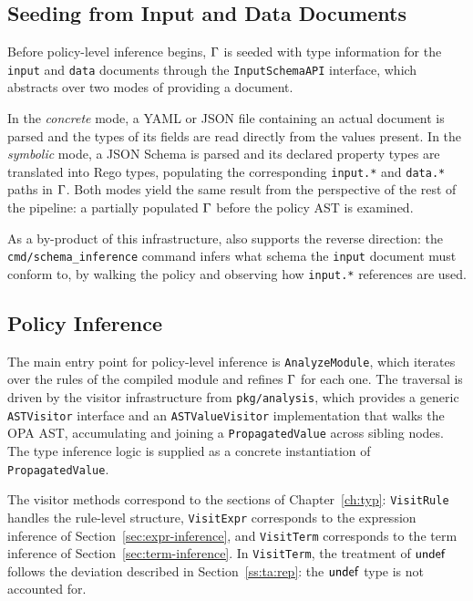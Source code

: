 \subsection{Seeding from Input and Data Documents}
\label{ss:ta:seed}

Before policy-level inference begins, $\Gamma$ is seeded with type information for the \texttt{input} and \texttt{data} documents through the \texttt{InputSchemaAPI} interface, which abstracts over two modes of providing a document.

In the \emph{concrete} mode, a YAML or JSON file containing an actual document is parsed and the types of its fields are read directly from the values present.
In the \emph{symbolic} mode, a JSON Schema is parsed and its declared property types are translated into Rego types, populating the corresponding \texttt{input.*} and \texttt{data.*} paths in $\Gamma$.
Both modes yield the same result from the perspective of the rest of the pipeline: a partially populated $\Gamma$ before the policy AST is examined.

As a by-product of this infrastructure, \verirego{} also supports the reverse direction: the \texttt{cmd/schema\_inference} command infers what schema the \texttt{input} document must conform to, by walking the policy and observing how \texttt{input.*} references are used.

\subsection{Policy Inference}
\label{ss:ta:infer}

The main entry point for policy-level inference is \texttt{AnalyzeModule}, which
iterates over the rules of the compiled module and refines $\Gamma$ for each one.
The traversal is driven by the visitor infrastructure from \texttt{pkg/analysis},
which provides a generic \texttt{ASTVisitor} interface and an \texttt{ASTValueVisitor}
implementation that walks the OPA AST, accumulating and joining a \texttt{PropagatedValue}
across sibling nodes.
The type inference logic is supplied as a concrete instantiation of \texttt{PropagatedValue}.

The visitor methods correspond to the sections of Chapter~\ref{ch:typ}:
\texttt{VisitRule} handles the rule-level structure, \texttt{VisitExpr} corresponds to
the expression inference of Section~\ref{sec:expr-inference}, and \texttt{VisitTerm}
corresponds to the term inference of Section~\ref{sec:term-inference}.
In \texttt{VisitTerm}, the treatment of $\mathsf{undef}$ follows the deviation described in Section~\ref{ss:ta:rep}: the $\mathsf{undef}$ type is not accounted for.

